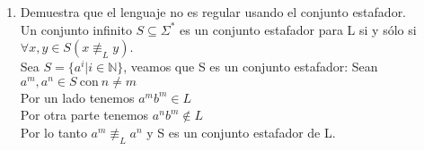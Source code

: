\documentclass{article}
\begin{document}
\begin{enumerate}
{\begin{enumerate}
{        	Se puede ver que cumplimos con  $|uv| \geq$ n y v $\neq \epsilon$. Si tomamos $m = 4$, por el lema del bombeo, $uv^4x \in L$.\\
        	
        	Pero tenemos que $uv^4x = a^ka^ja^ja^ja^ja^{n-k-j}xb^n = a^{n+3j}xb^n \notin L$, lo cual es una contradicción.\\
        	
        	Por lo tanto, L no es un lenguaje regular $\blacksquare$
        	}\\
        	\item{
        	Demuestra que el lenguaje no es regular usando el conjunto estafador.\\
        	
        	Un conjunto infinito $S \subseteq \Sigma^*$ es un conjunto estafador para L si y sólo si $\forall x,y \in S (x \not\equiv_L y)$.\\
        	
        	Sea $S = \{ a^i | i \in \mathbb{N}\}$, veamos que S es un conjunto estafador: Sean $a^m , a^n \in S \ \text{con} \ n \neq m$\\
        	
        	Por un lado tenemos $ a^mb^m \in L$\\
        	Por otra parte tenemos $a^nb^m \not \in L$\\
        	
        	Por lo tanto $a^m \not\equiv_L a^n$ y S es un conjunto estafador de L.
        	}
        \end{enumerate}
    	}
    \end{enumerate}
\end{document}
